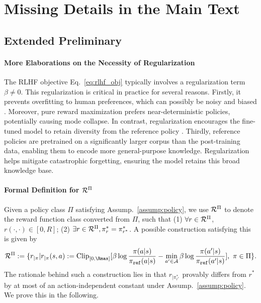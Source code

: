 \section{Missing Details in the Main Text}\label{appx:missing_details}

\subsection{Extended Preliminary}\label{appx:extend_prelim}
\paragraph{More Elaborations on the Necessity of Regularization} The RLHF objective Eq.~\eqref{eq:rlhf_obj} typically involves a regularization term $\beta\neq 0$. This regularization is critical in practice for several reasons.
Firstly, it prevents overfitting to human preferences, which can possibly be noisy and biased \citep{gao2023scaling, ouyang2022training}.
%
Moreover, pure reward maximization prefers near-deterministic policies, potentially causing mode collapse. In contrast, regularization encourages the fine-tuned model to retain diversity from the reference policy \citep{jaques2017sequence, jaques2019way}.
Thirdly, reference policies are pretrained on a significantly larger corpus than the post-training data, enabling them to encode more general-purpose knowledge. Regularization helps mitigate catastrophic forgetting, ensuring the model retains this broad knowledge base.

\paragraph{Formal Definition for $\mathcal{R}^\Pi$}
Given a policy class $\Pi$ satisfying Assump.~\ref{assump:policy}, we use $\mathcal{R}^{\Pi}$ to denote the reward function class converted from $\Pi$, such that (1) $\forall r\in\mathcal{R}^\Pi$, $r(\cdot,\cdot)\in[0, R]$; (2) $\exists r\in\mathcal{R}^{\Pi}, \pi_r^* = \pi^*_{r^*}$.
A possible construction satisfying this is given by
\begin{align}
    \cR^{\Pi} := \{r_{|\pi}|r_{|\pi}(s,a):=\text{Clip}_{[0,{\Rmax}]}[\beta\log\frac{\pi(a|s)}{\pi_\textref(a|s)} - \min_{a'\in\cA}\beta \log \frac{\pi(a'|s)}{\pi_\textref(a'|s)}],~\pi\in\Pi\}.\label{eq:reward_class_conversion}
\end{align}
The rationale behind such a construction lies in that $r_{|\pi^*_{r^*}}$ provably differs from $r^*$ by at most of an action-independent constant under Assump.~\ref{assump:policy}.
We prove this in the following.

